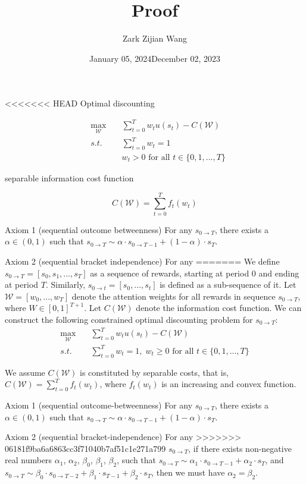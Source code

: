 \documentclass[
  12pt,
]{article}
\title{Proof}
\author{Zark Zijian Wang}
\date{January 05, 2024}
\date{December 02, 2023}
\begin{document}
\maketitle

<<<<<<< HEAD
Optimal discounting

\[
\begin{aligned}
&\max_{\mathcal{W}}\;&&\sum_{t=0}^T w_tu(s_t) - C(\mathcal{W}) \\
&s.t.\; &&\sum_{t=0}^Tw_t =1 \\
&&& w_t >0 \text{ for all } t\in \{0,1,...,T\}
\end{aligned}
\]

separable information cost function

\[
C(\mathcal{W})=\sum_{t=0}^Tf_t(w_t)
\]

Axiom 1 (sequential outcome betweenness) For any \(s_{0\rightarrow T}\),
there exists a \(\alpha\in(0,1)\) such that
\(s_{0\rightarrow T} \sim \alpha\cdot s_{0\rightarrow T-1}+(1-\alpha) \cdot s_T\).

Axiom 2 (sequential bracket independence) For any
=======
We define \(s_{0\rightarrow T}=[s_0,s_1,...,s_T]\) as a sequence of
rewards, starting at period 0 and ending at period \(T\). Similarly,
\(s_{0\rightarrow t}=[s_0,…,s_t]\) is defined as a sub-sequence of it.
Let \(\mathcal{W}=[w_0,...,w_T]\) denote the attention weights for all
rewards in sequence \(s_{0\rightarrow T}\), where \(W\in[0,1]^{T+1}\).
Let \(C(\mathcal{W})\) denote the information cost function. We can
construct the following constrained optimal discounting problem for
\(s_{0\rightarrow T}\):\[\tag{A.1}
\begin{aligned}
\max_{\mathcal{W}}  \quad &\sum_{t=0}^T w_tu(s_t) - C(\mathcal{W}) \\
s.t. \quad &  \sum_{t=0}^T w_t=1,\; w_t \geq 0 \text{ for all } t\in\{0,1,…,T\} \\ \\
\end{aligned}
\]We assume \(C(\mathcal{W})\) is constituted by separable costs, that
is, \(C(\mathcal{W})=\sum_{t=0}^Tf_t(w_t)\), where \(f_t(w_t)\) is an
increasing and convex function.

Axiom 1 (sequential outcome-betweenness) For any \(s_{0\rightarrow T}\),
there exists a \(\alpha\in(0,1)\) such that
\(s_{0\rightarrow T} \sim \alpha\cdot s_{0\rightarrow T-1}+(1-\alpha) \cdot s_T\).

Axiom 2 (sequential bracket-independence) For any
>>>>>>> 06181f9ba6a6863cc3f71040b7af51c1e271a799
\(s_{0\rightarrow T}\), if there exists non-negative real numbers
\(\alpha_1\), \(\alpha_2\), \(\beta_0\), \(\beta_1\), \(\beta_2\), such
that
\(s_{0\rightarrow T}\sim \alpha_1 \cdot s_{0\rightarrow T-1} + \alpha_2 \cdot s_{T}\),
and
\(s_{0\rightarrow T}\sim \beta_0 \cdot s_{0\rightarrow T-2}+\beta_1 \cdot s_{T-1}+\beta_2 \cdot s_{T}\),
then we must have \(\alpha_2 = \beta_2\).
\end{document}
